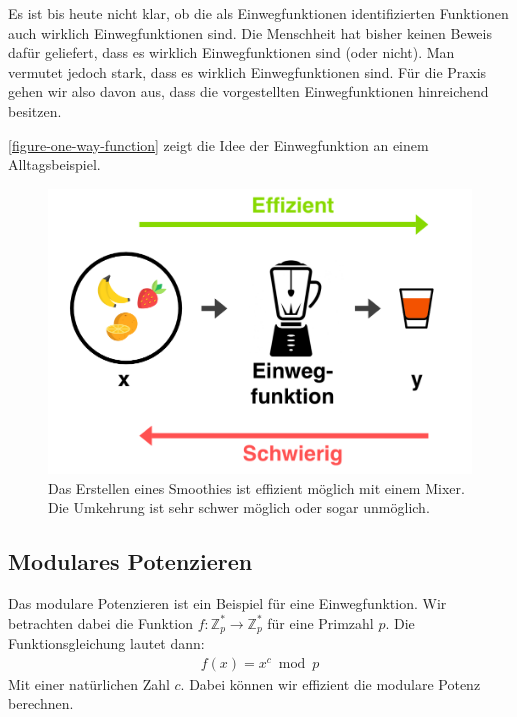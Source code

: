 \begin{hinweis}
	Es ist bis heute nicht klar, ob die als Einwegfunktionen identifizierten Funktionen auch wirklich Einwegfunktionen sind. Die Menschheit hat bisher keinen Beweis dafür geliefert, dass es wirklich Einwegfunktionen sind (oder nicht). Man vermutet jedoch stark, dass es wirklich Einwegfunktionen sind. Für die Praxis gehen wir also davon aus, dass die vorgestellten Einwegfunktionen hinreichend  besitzen.
\end{hinweis}


\autoref{figure-one-way-function} zeigt die Idee der Einwegfunktion an einem Alltagsbeispiel.

\begin{figure}[htb]
	\centering
	\includegraphics[scale=0.2]{one_way_function}
	\caption{Das Erstellen eines Smoothies ist effizient möglich mit einem Mixer. Die Umkehrung ist sehr schwer möglich oder sogar unmöglich.}
	\label{figure-one-way-function}
\end{figure}

\subsection{Modulares Potenzieren}

Das modulare Potenzieren ist ein Beispiel für eine Einwegfunktion. Wir betrachten dabei die Funktion $f: \mathbb{Z}_p^* \rightarrow \mathbb{Z}_p^*$ für eine Primzahl $p$. Die Funktionsgleichung lautet dann:
\begin{align*}
	f(x) = x^c \bmod p
\end{align*}
Mit einer natürlichen Zahl $c$. Dabei können wir effizient die modulare Potenz berechnen.

